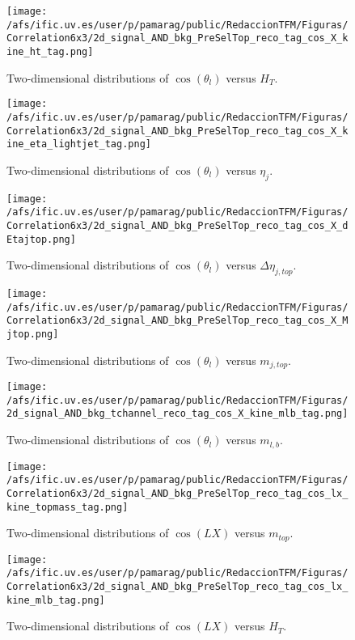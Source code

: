 \begin{figure}[h]
\centering
\texttt{[image: /afs/ific.uv.es/user/p/pamarag/public/RedaccionTFM/Figuras/Correlation6x3/2d\_signal\_AND\_bkg\_PreSelTop\_reco\_tag\_cos\_X\_kine\_ht\_tag.png]}
\caption{Two-dimensional distributions of $\cos(\theta_l)$ versus $H_T$.}
\end{figure}

\begin{figure}[h]
\centering
\texttt{[image: /afs/ific.uv.es/user/p/pamarag/public/RedaccionTFM/Figuras/Correlation6x3/2d\_signal\_AND\_bkg\_PreSelTop\_reco\_tag\_cos\_X\_kine\_eta\_lightjet\_tag.png]}
\caption{Two-dimensional distributions of $\cos(\theta_l)$ versus $\eta_j$.}
\end{figure}

\begin{figure}[h]
\centering
\texttt{[image: /afs/ific.uv.es/user/p/pamarag/public/RedaccionTFM/Figuras/Correlation6x3/2d\_signal\_AND\_bkg\_PreSelTop\_reco\_tag\_cos\_X\_dEtajtop.png]}
\caption{Two-dimensional distributions of $\cos(\theta_l)$ versus $\Delta\eta_{j,top}$.}
\end{figure}

\begin{figure}[h]
\centering
\texttt{[image: /afs/ific.uv.es/user/p/pamarag/public/RedaccionTFM/Figuras/Correlation6x3/2d\_signal\_AND\_bkg\_PreSelTop\_reco\_tag\_cos\_X\_Mjtop.png]}
\caption{Two-dimensional distributions of $\cos(\theta_l)$ versus $m_{j,top}$.}
\end{figure}

\begin{figure}[h]
\centering
\texttt{[image: /afs/ific.uv.es/user/p/pamarag/public/RedaccionTFM/Figuras/2d\_signal\_AND\_bkg\_tchannel\_reco\_tag\_cos\_X\_kine\_mlb\_tag.png]}
\caption{Two-dimensional distributions of $\cos(\theta_l)$ versus $m_{l,b}$.}
\label{Fig:mlbVScosX}
\end{figure}

\begin{figure}[h]
\centering
\texttt{[image: /afs/ific.uv.es/user/p/pamarag/public/RedaccionTFM/Figuras/Correlation6x3/2d\_signal\_AND\_bkg\_PreSelTop\_reco\_tag\_cos\_lx\_kine\_topmass\_tag.png]}
\caption{Two-dimensional distributions of $\cos(LX)$ versus $m_{top}$.}
\label{Fig:LXA}
\end{figure}

\begin{figure}[h]
\centering
\texttt{[image: /afs/ific.uv.es/user/p/pamarag/public/RedaccionTFM/Figuras/Correlation6x3/2d\_signal\_AND\_bkg\_PreSelTop\_reco\_tag\_cos\_lx\_kine\_mlb\_tag.png]}
\caption{Two-dimensional distributions of $\cos(LX)$ versus $H_T$.}
\end{figure}


